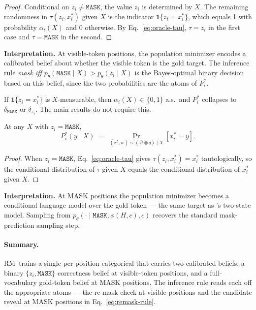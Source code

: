 \documentclass{llmxive}
\providecommand{\method}{RM\xspace}
\providecommand{\xstar}{x^{\ast}}
\providecommand{\mask}{\texttt{MASK}}
\begin{document}
\begin{proof}
Conditional on $z_i \neq \mask$, the value $z_i$ is determined by $X$. The remaining randomness in $\tau(z_i, \xstar_i)$ given $X$ is the indicator $\mathbf{1}\{z_i = \xstar_i\}$, which equals 1 with probability $\alpha_i(X)$ and 0 otherwise. By Eq.~\eqref{eq:oracle-tau}, $\tau = z_i$ in the first case and $\tau = \mask$ in the second.
\end{proof}

\textbf{Interpretation.} At visible-token positions, the population minimizer encodes a calibrated belief about whether the visible token is the gold target. The inference rule \emph{mask iff $p_\theta(\mask \mid X) > p_\theta(z_i \mid X)$} is the Bayes-optimal binary decision based on this belief, since the two probabilities are the atoms of $P^*_i$.

\begin{remark}
If $\mathbf{1}\{z_i = \xstar_i\}$ is $X$-measurable, then $\alpha_i(X) \in \{0, 1\}$ a.s.\ and $P^*_i$ collapses to $\delta_{\mask}$ or $\delta_{z_i}$. The main results do not require this.
\end{remark}

\begin{proposition}
\label{prop:mask-belief}
At any $X$ with $z_i = \mask$,
\[
P^*_i(y \mid X) \;=\; \Pr_{(\xstar, w) \sim (\mathcal{D} \otimes q) \mid X}[\xstar_i = y].
\]
\end{proposition}

\begin{proof}
When $z_i = \mask$, Eq.~\eqref{eq:oracle-tau} gives $\tau(z_i, \xstar_i) = \xstar_i$ tautologically, so the conditional distribution of $\tau$ given $X$ equals the conditional distribution of $\xstar_i$ given $X$.
\end{proof}

\textbf{Interpretation.} At MASK positions the population minimizer becomes a conditional language model over the gold token --- the same target as \cite{nie2025large}'s two-state model. Sampling from $p_\theta(\cdot \mid \mask, \phi(H, c), c)$ recovers the standard mask-prediction sampling step.

\paragraph{Summary.} \method\ trains a single per-position categorical that carries two calibrated beliefs: a binary $\{z_i, \mask\}$ correctness belief at visible-token positions, and a full-vocabulary gold-token belief at MASK positions. The inference rule reads each off the appropriate atoms --- the re-mask check at visible positions and the candidate reveal at MASK positions in Eq.~\ref{eq:remask-rule}.
\end{document}
